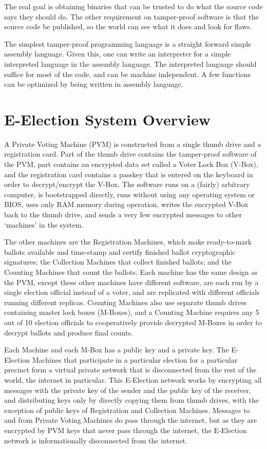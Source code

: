 \documentclass[12pt]{article}
\begin{document}
The real goal is obtaining binaries that can be trusted to
do what the source code says they should do.  The other
requirement on tamper-proof software is that the source code
be published, so the world can see what it does and look
for flaws.

The simplest tamper-proof programming language is a straight
forward simple assembly language.  Given this, one can write
an interpreter for a simple interpreted language in the
assembly language.  The interpreted language should suffice
for most of the code, and can be machine independent.
A few functions can be optimized by being written in assembly
language.

\section{E-Election System Overview}

A Private Voting Machine
(PVM) is constructed from a single thumb drive and a
registration card.  Part of the thumb drive contains the
tamper-proof software of the PVM, part contains an encrypted
data set called a Voter Lock Box (V-Box), and the registration
card contains a passkey that is entered on the keyboard in
order to decrypt/encrypt the V-Box.  The software runs on
a (fairly) arbitrary computer, is bootstrapped directly,
runs without using any operating system or BIOS,
uses only RAM memory during operation,
writes the encrypted V-Box back to the thumb drive, and sends
a very few encrypted messages to other `machines' in the
system.

The other machines are the Registration Machines, which make
ready-to-mark ballots available and time-stamp and certify
finished ballot cryptographic signatures;
the Collection Machines that collect
finished ballots; and the Counting Machines that count the
ballots.  Each machine has the same design as the PVM, except
these other machines have different software,
are each run by a single election official instead of a voter, and
are replicated with different officials running different
replicas.  Counting Machines also use separate
thumb drives containing master lock boxes
(M-Boxes), and a Counting Machine requires
any 5 out of 10 election officials to cooperatively
provide decrypted M-Boxes in order to decrypt ballots and
produce final counts.

Each Machine and each M-Box has a public key and a private key.
The E-Election Machines that participate in
a particular election for a particular
precinct form a virtual private network that is disconnected from
the rest of the world, the internet in particular.  This E-Election
network works by encrypting all messages with the private key of the
sender and the public key of the receiver, and distributing
keys only by directly copying them from
thumb drives, with the exception of public keys of Registration and
Collection Machines.  Messages to and from Private Voting Machines do pass
through the internet, but as they are encrypted by PVM keys that never
pass through the internet, the E-Election network is informationally
disconnected from the internet.
\end{document}
